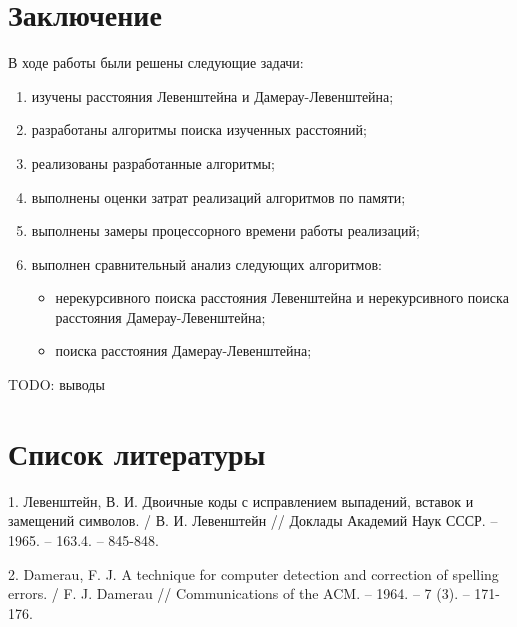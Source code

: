 \documentclass[oneside, a4paper, 12pt]{article}
\begin{document}
\section{Заключение}

В ходе работы были решены следующие задачи:

\begin{enumerate}
    \item изучены расстояния Левенштейна и Дамерау-Левенштейна;
    \item разработаны алгоритмы поиска изученных расстояний;
    \item реализованы разработанные алгоритмы;
    \item выполнены оценки затрат реализаций алгоритмов по памяти;
    \item выполнены замеры процессорного времени работы реализаций;
    \item выполнен сравнительный анализ следующих алгоритмов:
    \begin{itemize}
        \item нерекурсивного поиска расстояния Левенштейна и
            нерекурсивного поиска расстояния Дамерау-Левенштейна;
        \item поиска расстояния Дамерау-Левенштейна;
    \end{itemize}
\end{enumerate}

TODO: выводы

\section{Список литературы}

1. Левенштейн, В. И. Двоичные коды с исправлением выпадений,
вставок и замещений символов. / В. И. Левенштейн // Доклады
Академий Наук СССР. -- 1965. -- 163.4. -- 845-848.

2. Damerau, F. J. A technique for computer detection and correction
of spelling errors. / F. J. Damerau // Communications of the ACM.
-- 1964. -- 7 (3). -- 171-176.
\end{document}
